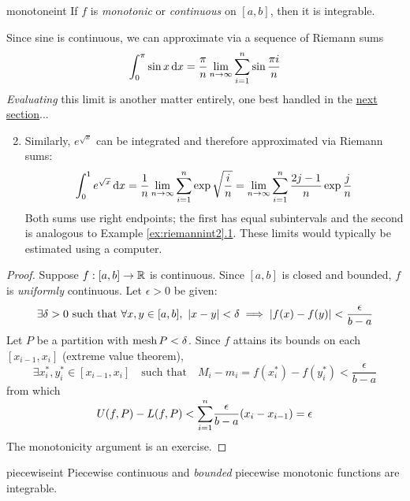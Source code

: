 \begin{thm}{}{monotoneint}
If $f$ is \emph{monotonic} or \emph{continuous} on $[a,b]$, then it is integrable.
\end{thm}






\begin{examples}{}{}
\exstart Since sine is continuous, we can approximate via a sequence of Riemann sums
\[\int_0^\pi\sin x\,{\mathrm{d} x} =\frac\pi{n}\lim_{n\to\infty}\sum_{i=1}^n\sin\frac{\pi i}{n}\]
\emph{Evaluating} this limit is another matter entirely, one best handled in the \hyperref[sec:ftc]{next section}...
\begin{enumerate}\setcounter{enumi}{1}
  \item Similarly, $e^{\sqrt x}$ can be integrated and therefore approximated via Riemann sums:
  \[\displaystyle\int_0^1 e^{\sqrt x}\,{\mathrm{d} x} =\frac 1{n}\lim\limits_{n\to\infty}\sum_{i=1}^n \exp\sqrt{\frac in} = \lim\limits_{n\to\infty}\sum_{i=1}^n \frac{2j-1}n\exp\frac jn\]
  Both sums use right endpoints; the first has equal subintervals and the second is analogous to Example \hyperref[ex:riemannint2]{\ref*{ex:riemannint2}.1}. These limits would typically be estimated using a computer.
\end{enumerate}
\end{examples}

\begin{proof}
Suppose $f:[a,b]\to\mathbb{R}$ is continuous. Since $[a,b]$ is closed and bounded, $f$ is \emph{uniformly} continuous. Let $\epsilon>0$ be given:
\[\exists\delta>0\text{ such that }\forall x,y\in[a,b],\ \nm{x-y}<\delta\implies\nm{f(x)-f(y)}<\frac\epsilon{b-a}\]
Let $P$ be a partition with $\operatorname{mesh} P<\delta$. Since $f$ attains its bounds on each $[x_{i-1},x_i]$ (extreme value theorem),
\[
\exists x_i^*,y_i^*\in [x_{i-1},x_i]\quad\text{such that}\quad M_i-m_i=f(x_i^*)-f(y_i^*)<\frac\epsilon{b-a}
\]
from which
\[
U(f,P)-L(f,P)<\smash[t]{\sum_{i=1}^n}\frac\epsilon{b-a}(x_i-x_{i-1})=\epsilon
\]
The monotonicity argument is an exercise.
\end{proof}

\goodbreak

\begin{cor}{}{piecewiseint}
Piecewise continuous and \emph{bounded} piecewise monotonic functions are integrable.
\end{cor}

